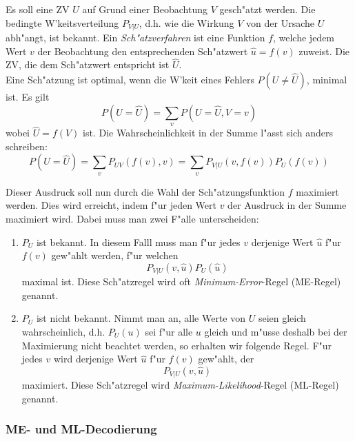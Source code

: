 \documentclass[german, 10pt, a4paper, twocolumn]{scrartcl}
\begin{document}
Es soll eine ZV $U$ auf Grund einer Beobachtung $V$ gesch"atzt werden. Die bedingte W'keitsverteilung $P_{V|U}$, d.h. wie die Wirkung $V$ von der Ursache $U$ abh"angt, ist bekannt. Ein \textit{Sch"atzverfahren} ist eine Funktion $f$, welche jedem Wert $v$ der Beobachtung den entsprechenden Sch"atzwert $\hat{u} = f(v)$ zuweist. Die ZV, die dem Sch"atzwert entspricht ist $\hat{U}$.\\
Eine Sch"atzung ist optimal, wenn die W'keit eines Fehlers $P(U\neq \hat{U})$, minimal ist. Es gilt 
\begin{displaymath}
	P(U = \hat{U}) = \sum_v P(U = \hat{U}, V = v)
\end{displaymath}
wobei $\hat{U}=f(V)$ ist. Die Wahrscheinlichkeit in der Summe l"asst sich anders schreiben:
\begin{displaymath}
	P(U=\hat{U}) = \sum_v P_{UV}(f(v),v) = \sum_v P_{V|U}(v,f(v))P_U(f(v))
\end{displaymath}

Dieser Ausdruck soll nun durch die Wahl der Sch"atzungsfunktion $f$ maximiert werden. Dies wird erreicht, indem f"ur jeden Wert $v$ der Ausdruck in der Summe maximiert wird. Dabei muss man zwei F"alle unterscheiden:
\begin{enumerate}
	\item $P_U$ ist bekannt. In diesem Falll muss man f"ur jedes $v$ derjenige Wert $\hat{u}$ f"ur $f(v)$ gew"ahlt werden, f"ur welchen
	\begin{displaymath}
		P_{V|U}(v,\hat{u})P_U(\hat{u})
	\end{displaymath}
	maximal ist. Diese Sch"atzregel wird oft \textit{Minimum-Error}-Regel (ME-Regel) genannt.
	\item $P_U$ ist nicht bekannt. Nimmt man an, alle Werte von $U$ seien gleich wahrscheinlich, d.h. $P_U(u)$ sei f"ur alle $u$ gleich und m"usse deshalb bei der Maximierung nicht beachtet werden, so erhalten wir folgende Regel. F"ur jedes $v$ wird derjenige Wert $\hat{u}$ f"ur $f(v)$ gew"ahlt, der
	\begin{displaymath}
		P_{V|U}(v,\hat{u})
	\end{displaymath}
	maximiert. Diese Sch"atzregel wird \textit{Maximum-Likelihood}-Regel (ML-Regel) genannt.
\end{enumerate}

\subsubsection{ME- und ML-Decodierung}
\end{document}
